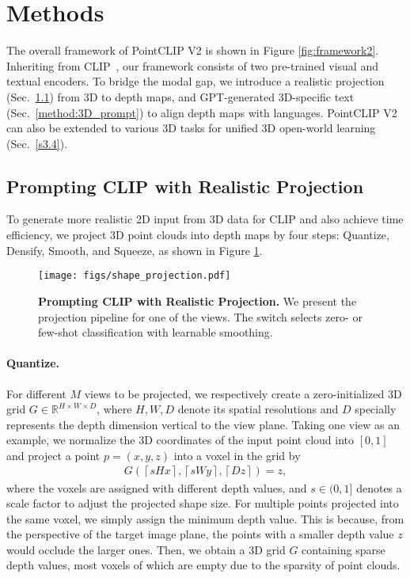 \documentclass[10pt,twocolumn,letterpaper]{article}
\begin{document}
\section{Methods}
\label{sec:methods}
The overall framework of PointCLIP V2 is shown in Figure \ref{fig:framework2}. Inheriting from CLIP~\cite{radford2021learning}, our framework consists of two pre-trained visual and textual encoders. To bridge the modal gap, we introduce a realistic projection (Sec.~\ref{method:shape_projection}) from 3D to depth maps, and GPT-generated 3D-specific text (Sec.~\ref{method:3D_prompt}) to align depth maps with languages. PointCLIP V2 can also be extended to various 3D tasks for unified 3D open-world learning (Sec.~\ref{s3.4}).


\subsection{Prompting CLIP with Realistic Projection}
\label{method:shape_projection}

To generate more realistic 2D input from 3D data for CLIP and also achieve time efficiency, we project 3D point clouds into depth maps by four steps: Quantize, Densify, Smooth, and Squeeze, as shown in Figure \ref{fig:shape_projection}.

\begin{figure}[t!]
\centering
\texttt{[image: figs/shape\_projection.pdf]}
\vspace{0.19cm}
\caption{\textbf{Prompting CLIP with Realistic Projection.} We present the projection pipeline for one of the views. The switch selects zero- or few-shot classification with learnable smoothing.}
\label{fig:shape_projection}
\vspace{-0.1cm}
\end{figure}

\vspace{-6pt}
\paragraph{Quantize.} 
For different $M$ views to be projected, we respectively create a zero-initialized 3D grid $G \in \mathbb{R}^{H \times W \times D}$, where $H, W, D$ denote its spatial resolutions and $D$ specially represents the depth dimension vertical to the view plane.
Taking one view as an example, we normalize the 3D coordinates of the input point cloud into $[0,1]$ and project a point $p=(x,y,z)$ into a voxel in the grid by
\begin{align}
G(\left \lceil sHx \right \rceil, \left \lceil sWy \right \rceil, \left \lceil Dz \right \rceil)=z,
\label{eq:quantize}
\end{align}
where the voxels are assigned with different depth values, and $s \in (0,1]$ denotes a scale factor to adjust the projected shape size. For multiple points projected into the same voxel, we simply assign the minimum depth value. This is because, from the perspective of the target image plane, the points with a smaller depth value $z$ would occlude the larger ones.
Then, we obtain a 3D grid $G$ containing sparse depth values, most voxels of which are empty due to the sparsity of point clouds.
\end{document}
